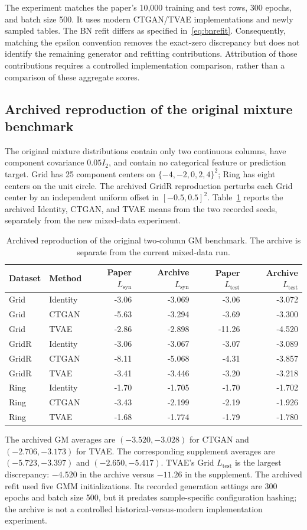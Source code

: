 \documentclass[11pt,letterpaper]{article}
\newcommand{\Lsyn}{L_{\mathrm{syn}}}
\newcommand{\Ltest}{L_{\mathrm{test}}}
\begin{document}
The experiment matches the paper's 10,000 training and test rows, 300 epochs, and batch size 500. It uses modern CTGAN/TVAE implementations and newly sampled tables. The BN refit differs as specified in~\eqref{eq:bnrefit}. Consequently, matching the epsilon convention removes the exact-zero discrepancy but does not identify the remaining generator and refitting contributions. Attribution of those contributions requires a controlled implementation comparison, rather than a comparison of these aggregate scores.

\subsection{Archived reproduction of the original mixture benchmark}
The original mixture distributions contain only two continuous columns, have component covariance $0.05I_2$, and contain no categorical feature or prediction target. Grid has 25 component centers on $\{-4,-2,0,2,4\}^2$; Ring has eight centers on the unit circle. The archived GridR reproduction perturbs each Grid center by an independent uniform offset in $[-0.5,0.5]^2$. Table~\ref{tab:archivedgm} reports the archived Identity, CTGAN, and TVAE means from the two recorded seeds, separately from the new mixed-data experiment.
\begin{table}[H]\centering
\caption{Archived reproduction of the original two-column GM benchmark. The archive is separate from the current mixed-data run.}\label{tab:archivedgm}
\small
\begin{tabular}{llrrrr}\toprule
Dataset & Method & Paper $\Lsyn$ & Archive $\Lsyn$ & Paper $\Ltest$ & Archive $\Ltest$\\\midrule
Grid & Identity & -3.06 & -3.069 & -3.06 & -3.072\\
Grid & CTGAN & -5.63 & -3.294 & -3.69 & -3.300\\
Grid & TVAE & -2.86 & -2.898 & -11.26 & -4.520\\
GridR & Identity & -3.06 & -3.067 & -3.07 & -3.089\\
GridR & CTGAN & -8.11 & -5.068 & -4.31 & -3.857\\
GridR & TVAE & -3.41 & -3.446 & -3.20 & -3.218\\
Ring & Identity & -1.70 & -1.705 & -1.70 & -1.702\\
Ring & CTGAN & -3.43 & -2.199 & -2.19 & -1.926\\
Ring & TVAE & -1.68 & -1.774 & -1.79 & -1.780\\
\bottomrule\end{tabular}
\end{table}
The archived GM averages are $(-3.520,-3.028)$ for CTGAN and $(-2.706,-3.173)$ for TVAE. The corresponding supplement averages are $(-5.723,-3.397)$ and $(-2.650,-5.417)$. TVAE's Grid $\Ltest$ is the largest discrepancy: $-4.520$ in the archive versus $-11.26$ in the supplement. The archived refit used five GMM initializations. Its recorded generation settings are 300 epochs and batch size 500, but it predates sample-specific configuration hashing; the archive is not a controlled historical-versus-modern implementation experiment.
\end{document}
